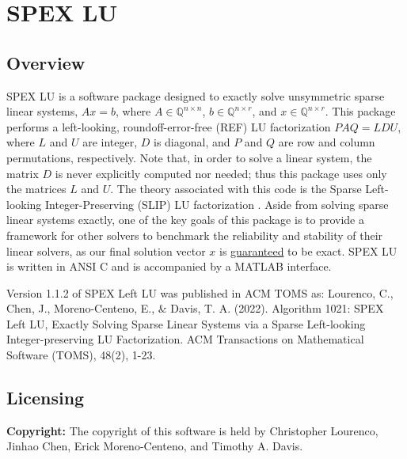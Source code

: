\documentclass[12pt,oneside]{book}
\theoremstyle{definition}
\begin{document}
\chapter{SPEX LU}\vspace{-0.75in} \label{ch:LeftLU}

\section{Overview} \label{s:LeftLU:intro}
SPEX LU is a software package designed to exactly solve unsymmetric sparse
linear systems, $ A x = b$, where $A \in \mathbb{Q}^{n \times
n}$, $b \in \mathbb{Q}^{n \times r}$, and $x \in \mathbb{Q}^{n \times
r}$. This package performs a left-looking, roundoff-error-free (REF) LU
factorization $P A Q = L D U$, where $L$ and $U$ are integer, $D$ is diagonal,
and $P$ and $Q$ are row and column permutations, respectively. 
Note that, in order to solve a linear system, the matrix $D$ is never explicitly computed nor needed; thus this 
package uses only the matrices $L$ and $U$. The theory associated with this code is the Sparse Left-looking Integer-Preserving (SLIP) LU factorization
 \cite{lourenco2019exact}. Aside from
solving sparse linear systems exactly, one of the key goals of this package is
to provide a framework for other solvers to benchmark the reliability and
stability of their linear solvers, as our final solution vector $x$ is
\ul{guaranteed} to be exact. SPEX LU is written in ANSI C and is accompanied by a MATLAB interface.

Version 1.1.2 of SPEX Left LU was published in ACM TOMS as:
Lourenco, C., Chen, J., Moreno-Centeno, E., \& Davis, T. A. (2022). Algorithm 1021: SPEX Left LU, Exactly Solving Sparse Linear Systems via a Sparse Left-looking Integer-preserving LU Factorization. ACM Transactions on Mathematical Software (TOMS), 48(2), 1-23.


\section{Licensing} \label{s:LeftLU:licensing}
\textbf{Copyright:} The copyright of this software is held by  Christopher Lourenco, Jinhao Chen, Erick Moreno-Centeno, and Timothy A. Davis.\\
\end{document}
